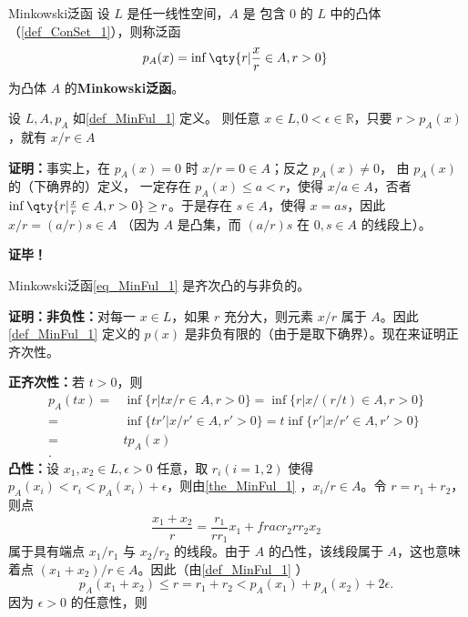 

\begin{definition}{Minkowski泛函}\label{def_MinFul_1}
设 $L$ 是任一线性空间，$A$ 是 包含 0 的 $L$ 中的凸体（\autoref{def_ConSet_1}），则称泛函
\begin{equation}\label{eq_MinFul_1}
p_A(x)=\inf\qty{r|\frac{x}{r}\in A,r>0}~
\end{equation}
为凸体 $A$ 的\textbf{Minkowski泛函}。

\end{definition}

\begin{lemma}{}
设 $L,A,p_A$ 如\autoref{def_MinFul_1} 定义。 则任意 $x\in L,0<\epsilon\in\mathbb R$，只要 $r>p_A(x)$，就有 $x/r\in A$
\end{lemma}
\textbf{证明：}事实上，在 $p_A(x)=0$ 时 $x/r=0\in A$；反之 $p_A(x)\neq0$， 由 $p_A(x)$ 的（下确界的）定义， 一定存在 $p_A(x)\leq a<r$，使得 $x/a\in A$，否者$\inf\qty{r|\frac{x}{r}\in A,r>0}\geq r$。于是存在 $s\in A$，使得 $x=as$，因此 $x/r=(a/r)s\in A$ （因为 $A$ 是凸集，而 $(a/r)s$ 在 $0,s\in A$ 的线段上）。

\textbf{证毕！}

\begin{theorem}{}\label{the_MinFul_1}
Minkowski泛函\autoref{eq_MinFul_1} 是齐次凸的与非负的。
\end{theorem}

\textbf{证明：}\textbf{非负性：}对每一 $x\in L$，如果 $r$ 充分大，则元素 $x/r$ 属于 $A$。因此\autoref{def_MinFul_1} 定义的 $p(x)$ 是非负有限的（由于是取下确界）。现在来证明正齐次性。

\textbf{正齐次性：}若 $t>0$，则
\begin{equation}
\begin{aligned}
p_A(tx)=&\inf \{r|tx/r\in A,r>0\}=\inf \{r|x/(r/t)\in A,r>0\}\\
=&\inf \{tr'|x/r'\in A,r'>0\}=t\inf \{r'|x/r'\in A,r'>0\}\\
=&tp_A(x)\\.
\end{aligned}~
\end{equation}
\textbf{凸性：}设 $x_1,x_2\in L,\epsilon>0$ 任意，取 $r_i(i=1,2)$ 使得 $p_A(x_i)<r_i<p_A(x_i)+\epsilon$，则由\autoref{the_MinFul_1} ，$x_i/r\in A$。令 $r=r_1+r_2$，则点
\begin{equation}
\frac{x_1+x_2}{r}=\frac{r_1}{rr_1}x_1+frac{r_2}{rr_2}x_2~
\end{equation}
属于具有端点 $x_1/r_1$ 与 $x_2/r_2$ 的线段。由于 $A$ 的凸性，该线段属于 $A$，这也意味着点 $(x_1+x_2)/r\in A$。因此（由\autoref{def_MinFul_1} ）
\begin{equation}
p_A(x_1+x_2)\leq r=r_1+r_2<p_A(x_1)+p_A(x_2)+2\epsilon.~
\end{equation}
 因为 $\epsilon>0$ 的任意性，则

